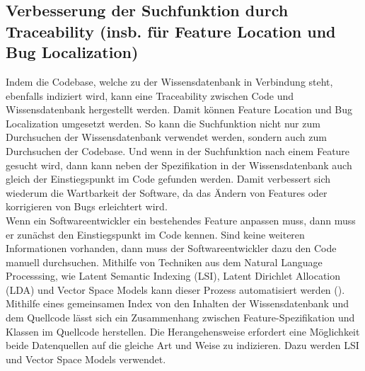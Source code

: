 
\subsection{Verbesserung der Suchfunktion durch Traceability (insb. für Feature Location und Bug Localization)}
Indem die Codebase, welche zu der Wissensdatenbank in Verbindung steht, ebenfalls indiziert wird, kann eine Traceability zwischen Code und Wissensdatenbank hergestellt werden.
Damit können Feature Location und Bug Localization umgesetzt werden.
So kann die Suchfunktion nicht nur zum Durchsuchen der Wissensdatenbank verwendet werden, sondern auch zum Durchsuchen der Codebase.
Und wenn in der Suchfunktion nach einem Feature gesucht wird, dann kann neben der Spezifikation in der Wissensdatenbank auch gleich der Einstiegspunkt im Code gefunden werden.
Damit verbessert sich wiederum die Wartbarkeit der Software, da das Ändern von Features oder korrigieren von Bugs erleichtert wird.\\

Wenn ein Softwareentwickler ein bestehendes Feature anpassen muss, dann muss er zunächst den Einstiegspunkt im Code kennen.
Sind keine weiteren Informationen vorhanden, dann muss der Softwareentwickler dazu den Code manuell durchsuchen.
Mithilfe von Techniken aus dem Natural Language Processsing, wie Latent Semantic Indexing (LSI), Latent Dirichlet Allocation (LDA) und Vector Space Models kann dieser Prozess automatisiert werden (\cite{Dit_Revelle_Gethers_Poshyvanyk_2011}).
Mithilfe eines gemeinsamen Index von den Inhalten der Wissensdatenbank und dem Quellcode lässt sich ein Zusammenhang zwischen Feature-Spezifikation und Klassen im Quellcode herstellen.
Die Herangehensweise erfordert eine Möglichkeit beide Datenquellen auf die gleiche Art und Weise zu indizieren.
Dazu werden LSI und Vector Space Models verwendet.

